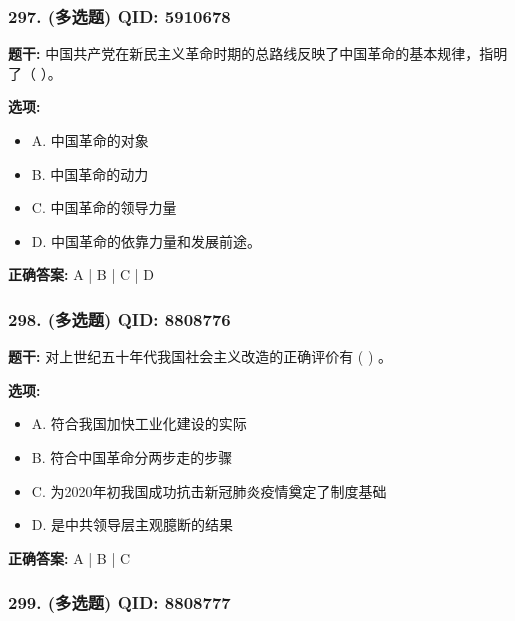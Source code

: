 \documentclass[12pt,UTF8]{ctexart}
\begin{document}
\subsubsection*{297. (多选题) \small QID: 5910678}

\textbf{题干:}
中国共产党在新民主义革命时期的总路线反映了中国革命的基本规律，指明了（ ）。

\textbf{选项:}
\begin{itemize}[leftmargin=*]

  \item A. 中国革命的对象

  \item B. 中国革命的动力

  \item C. 中国革命的领导力量

  \item D. 中国革命的依靠力量和发展前途。

\end{itemize}

\textbf{正确答案:}
A | B | C | D

\vspace{0.3em}\hrulefill\vspace{0.7em}

\subsubsection*{298. (多选题) \small QID: 8808776}

\textbf{题干:}
对上世纪五十年代我国社会主义改造的正确评价有 ( ) 。

\textbf{选项:}
\begin{itemize}[leftmargin=*]

  \item A. 符合我国加快工业化建设的实际

  \item B. 符合中国革命分两步走的步骤

  \item C. 为2020年初我国成功抗击新冠肺炎疫情奠定了制度基础

  \item D. 是中共领导层主观臆断的结果

\end{itemize}

\textbf{正确答案:}
A | B | C

\vspace{0.3em}\hrulefill\vspace{0.7em}

\subsubsection*{299. (多选题) \small QID: 8808777}
\end{document}
